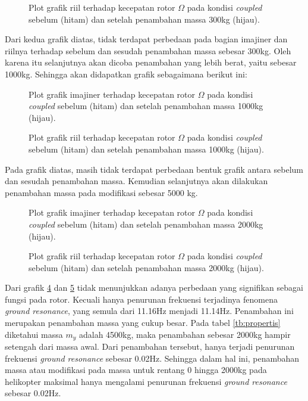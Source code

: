 \begin{figure}[H]
	\centering
	\caption{Plot grafik riil terhadap kecepatan rotor $\Omega$ pada kondisi \textit{coupled} sebelum (hitam) dan setelah penambahan massa 300kg (hijau).}
	\label{fig:real(modified)_1}
\end{figure}

Dari kedua grafik diatas, tidak terdapat perbedaan pada bagian imajiner dan riilnya terhadap sebelum dan sesudah penambahan massa sebesar 300kg. Oleh karena itu selanjutnya akan dicoba penambahan yang lebih berat, yaitu sebesar 1000kg. Sehingga akan didapatkan grafik sebagaimana berikut ini:

\begin{figure}[H]
	\centering
	\caption{Plot grafik imajiner terhadap kecepatan rotor $\Omega$ pada kondisi \textit{coupled} sebelum (hitam) dan setelah penambahan massa 1000kg (hijau).}
	\label{fig:imag(modified)_2}
\end{figure}

\begin{figure}[H]
	\centering
	\caption{Plot grafik riil terhadap kecepatan rotor $\Omega$ pada kondisi \textit{coupled} sebelum (hitam) dan setelah penambahan massa 1000kg (hijau).}
	\label{fig:real(modified)_2}
\end{figure}

Pada grafik diatas, masih tidak terdapat perbedaan bentuk grafik antara sebelum dan sesudah penambahan massa. Kemudian selanjutnya akan dilakukan penambahan massa pada modifikasi sebesar 5000 kg. 

\begin{figure}[H]
	\centering
	\caption{Plot grafik imajiner terhadap kecepatan rotor $\Omega$ pada kondisi \textit{coupled} sebelum (hitam) dan setelah penambahan massa 2000kg (hijau).}
	\label{fig:imag(modified)_3}
\end{figure}

\begin{figure}[H]
	\centering
	\caption{Plot grafik riil terhadap kecepatan rotor $\Omega$ pada kondisi \textit{coupled} sebelum (hitam) dan setelah penambahan massa 2000kg (hijau).}
	\label{fig:real(modified)_3}
\end{figure}

Dari grafik \ref{fig:imag(modified)_3} dan \ref{fig:real(modified)_3} tidak menunjukkan adanya perbedaan yang signifikan sebagai fungsi pada rotor. Kecuali hanya penurunan frekuensi terjadinya fenomena \textit{ground resonance}, yang semula dari 11.16Hz menjadi 11.14Hz. Penambahan ini merupakan penambahan massa yang cukup besar. Pada tabel \ref{tb:propertis} diketahui massa $m_y$ adalah 4500kg, maka penambahan sebesar 2000kg hampir setengah dari massa awal. Dari penambahan tersebut, hanya terjadi penurunan frekuensi \textit{ground resonance} sebesar 0.02Hz. Sehingga dalam hal ini, penambahan massa atau modifikasi pada massa untuk rentang 0 hingga 2000kg pada helikopter maksimal hanya mengalami penurunan frekuensi \textit{ground resonance} sebesar 0.02Hz.